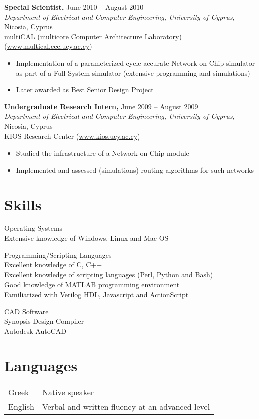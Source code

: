 \documentclass[11pt]{myres} %
\begin{document}
\begin{resume}
{\color{blue}\textbf{Special Scientist,} June 2010 -- August 2010} \\
\emph{Department of Electrical and Computer Engineering, University of Cyprus}, Nicosia, Cyprus \\
multiCAL (multicore Computer Architecture Laboratory) (\url{www.multical.ece.ucy.ac.cy}) \\
\begin{itemize} \itemsep -2pt
	\item Implementation of a parameterized cycle-accurate Network-on-Chip simulator as part of a Full-System simulator (extensive programming and simulations)
	\item Later awarded as Best Senior Design Project
\end{itemize}
 
{\color{blue}\textbf{Undergraduate Research Intern,} June 2009 -- August 2009} \\
\emph{Department of Electrical and Computer Engineering, University of Cyprus}, Nicosia, Cyprus \\ 
KIOS Research Center (\url{www.kios.ucy.ac.cy}) \\
\begin{itemize} \itemsep -2pt
	\item Studied the infrastructure of a Network-on-Chip module
	\item Implemented and assessed (simulations) routing algorithms for such networks
\end{itemize}

\section{Skills}
{\color{blue}Operating Systems}\\
Extensive knowledge of Windows, Linux and Mac OS

{\color{blue}Programming/Scripting Languages}\\
Excellent knowledge of C, C++\\
Excellent knowledge of scripting languages (Perl, Python and Bash)\\
Good knowledge of MATLAB programming environment\\
Familiarized with Verilog HDL, Javascript and ActionScript

{\color{blue}CAD Software}\\
Synopsis Design Compiler\\
Autodesk AutoCAD

\section{Languages}
\begin{tabular}{ll}
\color{blue}Greek & Native speaker \\[5pt]
\color{blue}English & Verbal and written fluency at an advanced level \\ 
\end{tabular} 
 

\end{resume}
\end{document}
